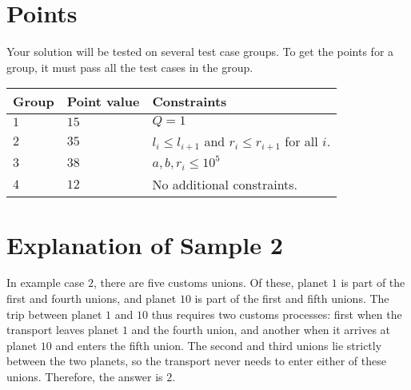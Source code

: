 \section*{Points}
Your solution will be tested on several test case groups.
To get the points for a group, it must pass all the test cases in the group.

\noindent
\begin{tabular}{| l | l | p{12cm} |}
  \hline
  \textbf{Group} & \textbf{Point value} & \textbf{Constraints} \\ \hline
  $1$   & $15$        & $Q=1$  \\ \hline
  $2$   & $35$        & $l_i \le l_{i + 1}$ and $r_i \le r_{i+1}$ for all $i$. \\ \hline
  $3$   & $38$       & $ a,b,r_i \leq 10^5$ \\ \hline
  $4$   & $12$       &  No additional constraints. \\ \hline
\end{tabular}

\section*{Explanation of Sample 2}
In example case $2$, there are five customs unions.
Of these, planet $1$ is part of the first and fourth unions, and planet $10$ is part of the first and fifth unions.
The trip between planet $1$ and $10$ thus requires two customs processes: first when the transport leaves planet $1$ and the fourth union, and another when it arrives at planet $10$ and enters the fifth union.
The second and third unions lie strictly between the two planets, so the transport never needs to enter either of these unions.
Therefore, the answer is $2$.
